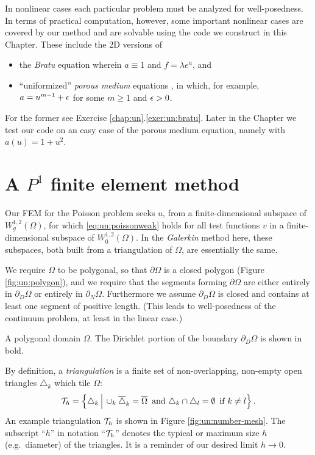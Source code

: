 In nonlinear cases each particular problem must be analyzed for well-posedness.  In terms of practical computation, however, some important nonlinear cases are covered by our method and are solvable using the code we construct in this Chapter.  These include the 2D versions of
\begin{itemize}
\item the \emph{Bratu} equation wherein $a\equiv 1$ and $f=\lambda e^u$, and
\item ``uniformized'' \emph{porous medium} equations \citep{Ockendonetal2003}, in which, for example, $a=u^{m-1}+\epsilon$ for some $m\ge 1$ and $\epsilon>0$.
\end{itemize}
For the former see Exercise \ref{chap:un}.\ref{exer:un:bratu}.  Later in the Chapter we test our code on an easy case of the porous medium equation, namely with $a(u)=1+u^2$.


\section{A $P^1$ finite element method}

Our FEM for the Poisson problem seeks $u$, from a finite-dimensional subspace of $W^{1,2}_g(\Omega)$, for which \eqref{eq:un:poissonweak} holds for all test functions $v$ in a finite-dimensional subspace of $W^{1,2}_0(\Omega)$.  In the \emph{Galerkin} method here, these subspaces, both built from a triangulation of $\Omega$, are essentially the same.

We require $\Omega$ to be polygonal, so that $\partial\Omega$ is a closed polygon (Figure \ref{fig:un:polygon}), and we require that the segments forming $\partial\Omega$ are either entirely in $\partial_D\Omega$ or entirely in $\partial_N\Omega$.  Furthermore we assume $\partial_D\Omega$ is closed and contains at least one segment of positive length.  (This leads to well-posedness of the continuum problem, at least in the linear case.)

\begin{marginfigure}

\caption{A polygonal domain $\Omega$.  The Dirichlet portion of the boundary $\partial_D\Omega$ is shown in bold.}
\label{fig:un:polygon}
\end{marginfigure}

By definition, a \emph{triangulation} is a finite set of non-overlapping, non-empty open triangles $\triangle_k$ which tile $\Omega$:
\begin{equation}
\mathcal{T}_h = \left\{\triangle_k \,\Big|\, \cup_k \overline{\triangle}_k = \overline{\Omega} \, \text{ and} \,\, \triangle_k \cap \triangle_l = \emptyset \, \text{ if } k\ne l\right\}. \label{eq:un:triangulation}
\end{equation}
An example triangulation $\mathcal{T}_h$ is shown in Figure \ref{fig:un:number-mesh}.  The subscript ``$h$'' in notation ``$\mathcal{T}_h$'' denotes the typical or maximum size $h$ (e.g.~diameter) of the triangles.  It is a reminder of our desired limit $h\to 0$.

